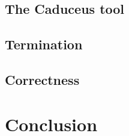 \documentclass[a4paper]{llncs}
\begin{document}
\subsection{The Caduceus tool}

\subsection{Termination}

\subsection{Correctness}

\section{Conclusion}

\nocite{*}


\end{document}
